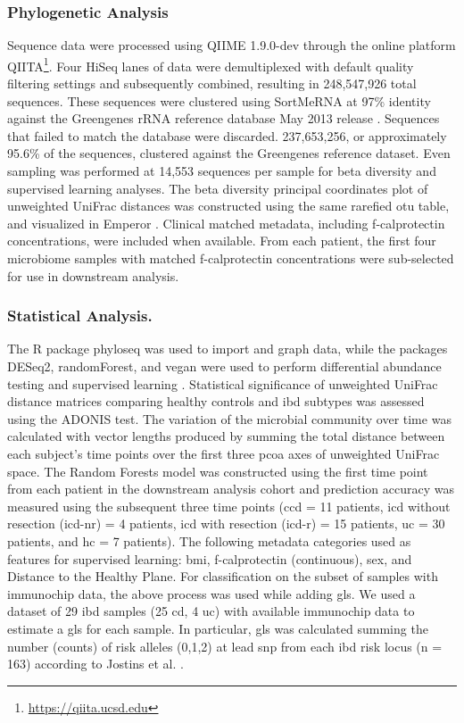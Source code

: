 \subsubsection{Phylogenetic Analysis}

Sequence data were processed using QIIME 1.9.0-dev through the online platform QIITA\footnote{\url{https://qiita.ucsd.edu}}\cite{ Caporaso2010}. Four HiSeq lanes of data were demultiplexed with default quality filtering settings and subsequently combined, resulting in 248,547,926 total sequences. These sequences were clustered using SortMeRNA at 97\% identity against the Greengenes rRNA reference database May 2013 release \cite{Kopylova2012,McDonald2012}. Sequences that failed to match the database were discarded. 237,653,256, or approximately 95.6\% of the sequences, clustered against the Greengenes reference dataset. Even sampling was performed at 14,553 sequences per sample for beta diversity and supervised learning analyses. The beta diversity principal coordinates plot of unweighted UniFrac distances was constructed using the same rarefied \gls{otu} table, and visualized in Emperor \cite{Lozupone2005,Vazquez2013}. Clinical matched metadata, including f-calprotectin concentrations, were included when available. From each patient, the first four microbiome samples with matched f-calprotectin concentrations were sub-selected for use in downstream analysis. 

\subsubsection{Statistical Analysis.}

The R package phyloseq was used to import and graph data, while the packages DESeq2, randomForest, and vegan were used to perform differential abundance testing and supervised learning \cite{Ihaka1996,Liaw2002,Love2014,McMurdie2013,Oksanen2016}. Statistical significance of unweighted UniFrac distance matrices comparing healthy controls and \gls{ibd} subtypes was assessed using the ADONIS test. The variation of the microbial community over time was calculated with vector lengths produced by summing the total distance between each subject's time points over the first three \gls{pcoa} axes of unweighted UniFrac space. The Random Forests model was constructed using the first time point from each patient in the downstream analysis cohort and prediction accuracy was measured using the subsequent three time points  (\gls{ccd} = 11 patients, \gls{icd} without resection (\gls{icd}-nr) = 4 patients, \gls{icd} with resection (\gls{icd}-r) = 15 patients, \gls{uc} = 30 patients, and \gls{hc} = 7 patients). The following metadata categories used as features for supervised learning: \gls{bmi}, f-calprotectin (continuous), sex, and Distance to the Healthy Plane. For classification on the subset of samples with immunochip data, the above process was used while adding \gls{gls}. We used a dataset of 29 \gls{ibd} samples (25 \gls{cd}, 4 \gls{uc}) with available immunochip data to estimate a \gls{gls} for each sample. In particular, \gls{gls} was calculated summing the number (counts) of risk alleles (0,1,2) at lead \gls{snp} from each \gls{ibd} risk locus (n = 163) according to Jostins et al. \cite{Jostins2012}.

